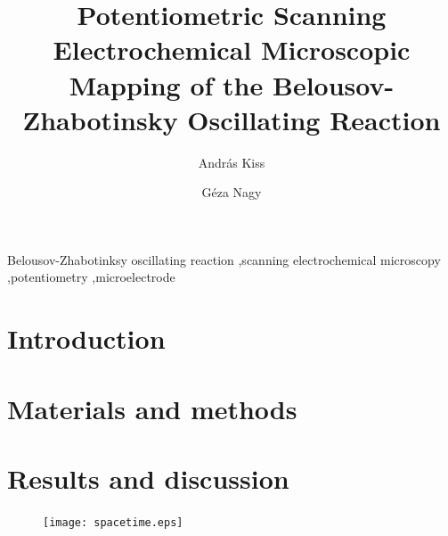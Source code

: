 \documentclass[3p]{elsarticle}
\begin{document}
\begin{frontmatter}

\title{Potentiometric Scanning Electrochemical Microscopic Mapping of the Belousov-Zhabotinsky Oscillating Reaction}
\author[akiss]{András Kiss}
\address[akiss, gnagy]{Department of General and Physical Chemistry, Faculty of Sciences, University of Pécs, 7624 Pécs, Ifjúság útja 6, Hungary}
\author[gnagy]{Géza Nagy}


\begin{abstract}

\end{abstract}
\begin{keyword}
	Belousov-Zhabotinksy oscillating reaction \sep scanning electrochemical microscopy \sep potentiometry \sep microelectrode
\end{keyword}
\end{frontmatter}

\section{Introduction}

\section{Materials and methods}

\section{Results and discussion}

\def\s{0.5}
\begin{figure}
\centering
\texttt{[image: spacetime.eps]}
\caption{}
\label{fig:2d}
\end{figure}

\end{document}
